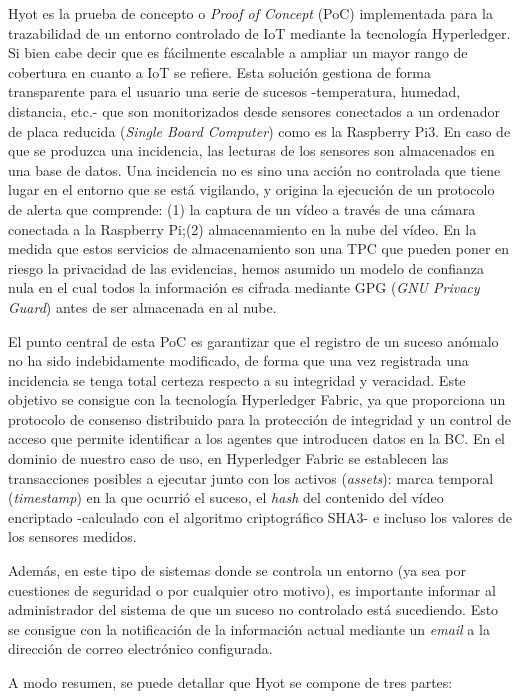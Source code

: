 \documentclass[10pt,conference,a4paper]{IEEEtran}
\begin{document}
Hyot es la prueba de concepto o \textit{Proof of Concept} (PoC)
implementada para la trazabilidad de un entorno controlado de IoT
mediante la tecnología Hyperledger. Si bien cabe decir que es
fácilmente escalable a ampliar un mayor rango de cobertura en cuanto a
IoT se refiere. Esta solución gestiona de forma transparente para el
usuario una serie de sucesos -temperatura, humedad, distancia, etc.-
que son monitorizados desde sensores conectados a un ordenador de
placa reducida (\textit{Single Board Computer}) como es la Raspberry
Pi3. En caso de que se produzca una incidencia, las lecturas de los
sensores son almacenados en una base de datos. Una incidencia no es
sino una acción no controlada que tiene lugar en el entorno que se
está vigilando, y origina la ejecución de un protocolo de alerta que
comprende: (1) la captura de un vídeo a través de una cámara conectada
a la Raspberry Pi;(2) almacenamiento en la nube del vídeo. En la
medida que estos servicios de almacenamiento son una TPC que pueden
poner en riesgo la privacidad de las evidencias, hemos asumido un
modelo de confianza nula en el cual todos la información es cifrada
mediante  GPG (\textit{GNU Privacy Guard}) antes de ser almacenada en
al nube.

El  punto central de esta PoC es garantizar que el
registro de un  suceso anómalo no ha sido indebidamente
modificado, de forma que una vez registrada una incidencia se tenga
total certeza respecto a su integridad y veracidad. Este objetivo se
consigue con la tecnología Hyperledger Fabric, ya que proporciona un
protocolo de consenso distribuido para la protección de integridad y
un control de acceso que permite identificar a los agentes que
introducen datos en la BC. En el dominio de nuestro caso de uso, en Hyperledger
Fabric se establecen las transacciones posibles a ejecutar junto con
los activos (\textit{assets}): marca temporal (\textit{timestamp}) en
la que ocurrió el suceso, el \textit{hash} del contenido del vídeo
encriptado -calculado con el algoritmo criptográfico SHA3- e incluso
los valores de los sensores medidos.

Además, en este tipo de sistemas donde se controla un entorno (ya sea
por cuestiones de seguridad o por cualquier otro motivo), es importante
informar al administrador del sistema de que un suceso no
controlado está sucediendo. Esto se consigue con la notificación de la
información actual mediante un \textit{email} a la dirección de correo
electrónico configurada.

A modo resumen, se puede detallar que Hyot se compone de tres partes:
\end{document}
